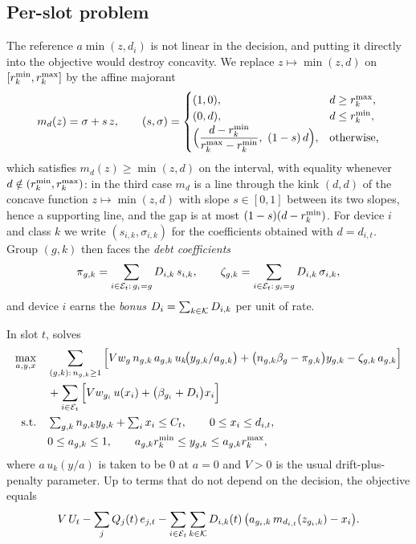 \subsection{Per-slot problem}

The reference $a\min(z,d_i)$ is not linear in the decision, and putting it directly into the objective would destroy concavity.
We replace $z\mapsto\min(z,d)$ on $[r^{\min}_k,r^{\max}_k]$ by the affine majorant
\begin{equation}\label{eq:maj}
m_d(z)=\sigma+s\,z,\qquad
(s,\sigma)=\begin{cases}
(1,0), & d\ge r^{\max}_k,\\
(0,d), & d\le r^{\min}_k,\\
\Big(\dfrac{d-r^{\min}_k}{r^{\max}_k-r^{\min}_k},\ (1-s)\,d\Big), & \text{otherwise,}
\end{cases}
\end{equation}
which satisfies $m_d(z)\ge\min(z,d)$ on the interval, with equality whenever $d\notin(r^{\min}_k,r^{\max}_k)$: in the third case $m_d$ is a line through the kink $(d,d)$ of the concave function $z\mapsto\min(z,d)$ with slope $s\in[0,1]$ between its two slopes, hence a supporting line, and the gap is at most $(1-s)(d-r^{\min}_k)$.
For device $i$ and class $k$ we write $(s_{i,k},\sigma_{i,k})$ for the coefficients obtained with $d=d_{i,t}$.
Group $(g,k)$ then faces the \emph{debt coefficients}
\begin{equation}\label{eq:debt}
\pi_{g,k}=\sum_{i\in\mathcal{E}_t:\,g_i=g}D_{i,k}\,s_{i,k},\qquad
\zeta_{g,k}=\sum_{i\in\mathcal{E}_t:\,g_i=g}D_{i,k}\,\sigma_{i,k},
\end{equation}
and device $i$ earns the \emph{bonus} $D_i=\sum_{k\in\mathcal{K}}D_{i,k}$ per unit of rate.

In slot $t$, \repay{} solves
\begin{equation}\label{eq:slot}
\begin{aligned}
\max_{a,y,x}\quad &\sum_{(g,k):\,n_{g,k}\ge 1}\Big[V w_g\,n_{g,k}\,a_{g,k}\,u_k\!\big(y_{g,k}/a_{g,k}\big)+\big(n_{g,k}\beta_g-\pi_{g,k}\big)y_{g,k}-\zeta_{g,k}\,a_{g,k}\Big]\\
&+\sum_{i\in\mathcal{E}_t}\Big[V w_{g_i}\,u(x_i)+\big(\beta_{g_i}+D_i\big)x_i\Big]\\
\text{s.t.}\quad &\textstyle\sum_{g,k}n_{g,k}y_{g,k}+\sum_i x_i\le C_t,\qquad 0\le x_i\le d_{i,t},\\
&0\le a_{g,k}\le 1,\qquad a_{g,k}r^{\min}_k\le y_{g,k}\le a_{g,k}r^{\max}_k ,
\end{aligned}
\end{equation}
where $a\,u_k(y/a)$ is taken to be $0$ at $a=0$ and $V>0$ is the usual drift-plus-penalty parameter.
Up to terms that do not depend on the decision, the objective equals
\begin{equation}\label{eq:dpp}
V\,U_t-\sum_jQ_j(t)\,e_{j,t}-\sum_{i\in\mathcal{E}_t}\sum_{k\in\mathcal{K}}D_{i,k}(t)\,\big(a_{g_i,k}\,m_{d_{i,t}}(z_{g_i,k})-x_i\big).
\end{equation}

